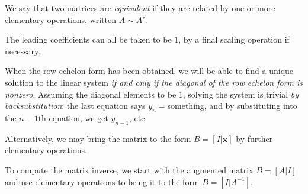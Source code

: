 We say that two matrices are \emph{equivalent} if they are related by one or more elementary operations, written $A \sim A'$.

The leading coefficients can all be taken to be $1$, by a final scaling operation if necessary.

When the row echelon form has been obtained, we will be able to find a unique solution to the linear system \emph{if and only if the diagonal of the row echelon form is nonzero}. Assuming the diagonal elements to be $1$, solving the system is trivial \emph{by backsubstitution}: the last equation says $y_n = $something, and by substituting into the $n-1$th equation, we get $y_{n-1}$, etc.

Alternatively, we may bring the matrix to the form $B = [I | \mathbf{x}]$ by further elementary operations.

To compute the matrix inverse, we start with the augmented matrix $B = [A | I]$ and use elementary operations to bring it to the form $\tilde{B} = [I | A^{-1}]$.

